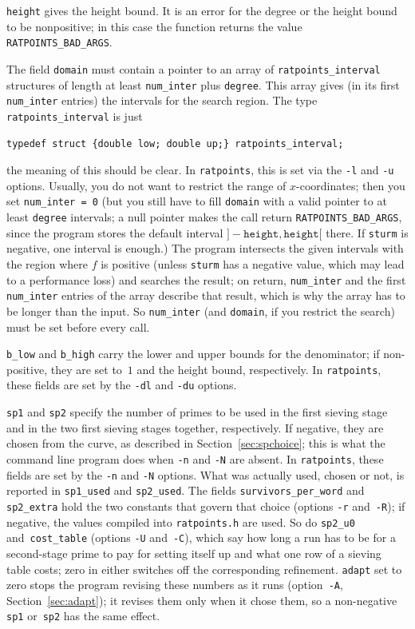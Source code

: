 \documentclass[12pt,a4paper,oneside]{amsart}
\begin{document}
\texttt{height} gives the height bound. It is an error for the
degree or the height bound to be nonpositive; in this case the function
returns the value \texttt{RATPOINTS\_BAD\_ARGS}.

The field \texttt{domain} must contain a pointer to an array of
\texttt{ratpoints\_interval} structures of length at least \texttt{num\_inter}
plus \texttt{degree}. This array gives (in its first \texttt{num\_inter} entries)
the intervals for the search region. The type \texttt{ratpoints\_interval}
is just

\begin{verbatim}
typedef struct {double low; double up;} ratpoints_interval;
\end{verbatim}

the meaning of this should be clear. In \texttt{ratpoints}, this is set
via the \verb+-l+ and \verb+-u+ options. Usually, you do not want to
restrict the range of $x$-coordinates; then you set \texttt{num\_inter = 0}
(but you still have to fill \texttt{domain} with a valid pointer to at least
\texttt{degree} intervals; a null pointer makes the call return
\texttt{RATPOINTS\_BAD\_ARGS}, since the program stores the default
interval $]-\texttt{height}, \texttt{height}[$ there. If \texttt{sturm} is
negative, one interval is enough.)
The program intersects the given intervals with the region where $f$ is
positive (unless \texttt{sturm} has a negative value, which may lead to a
performance loss) and searches the result; on return, \texttt{num\_inter}
and the first \texttt{num\_inter} entries of the array describe that
result, which is why the array has to be longer than the input. So
\texttt{num\_inter} (and \texttt{domain}, if you restrict the search) must
be set before every call.

\texttt{b\_low} and \texttt{b\_high}
carry the lower and upper bounds for the denominator; if non-positive, they are
set to~$1$ and the height bound, respectively. In \texttt{ratpoints}, these
fields are set by the \verb+-dl+ and \verb+-du+ options.

\texttt{sp1} and \texttt{sp2}
specify the number of primes to be used in the first sieving stage and
in the two first sieving stages together, respectively. If negative, they are chosen
from the curve, as described in Section~\ref{sec:spchoice}; this is what the
command line program does when \verb+-n+ and \verb+-N+ are absent. In
\texttt{ratpoints}, these fields are set by the
\verb+-n+ and \verb+-N+ options. What was actually used, chosen or not,
is reported in \texttt{sp1\_used} and \texttt{sp2\_used}. The fields
\texttt{survivors\_per\_word} and \texttt{sp2\_extra} hold the two
constants that govern that choice (options \verb+-r+ and~\verb+-R+); if
negative, the values compiled into \texttt{ratpoints.h} are used. So do
\texttt{sp2\_u0} and~\texttt{cost\_table} (options \verb+-U+ and~\verb+-C+),
which say how long a run has to be for a second-stage prime to pay for
setting itself up and what one row of a sieving table costs; zero in either
switches off the corresponding refinement. \texttt{adapt} set to zero stops
the program revising these numbers as it runs (option~\verb+-A+,
Section~\ref{sec:adapt}); it revises them only when it chose them, so a
non-negative \texttt{sp1} or~\texttt{sp2} has the same effect.
\end{document}
